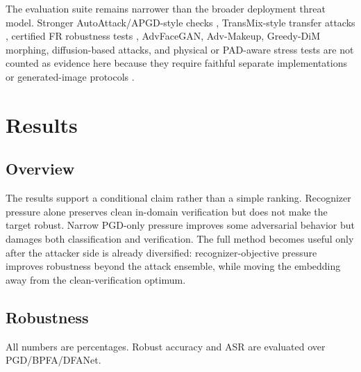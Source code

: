 \documentclass[conference]{IEEEtran}
\begin{document}
The evaluation suite remains narrower than the broader deployment threat
model. Stronger AutoAttack/APGD-style checks \cite{autoattack},
TransMix-style transfer attacks \cite{transmix}, certified FR robustness
tests \cite{certrobustfr}, AdvFaceGAN, Adv-Makeup, Greedy-DiM morphing,
diffusion-based attacks, and physical or PAD-aware stress tests are not counted
as evidence here because they require faithful separate implementations or
generated-image protocols
\cite{advfacegan,advmakeup,greedydim,physicalsurvey,fasattack}.

\section{Results}
\subsection{Overview}
The results support a conditional claim rather than a simple ranking.
Recognizer pressure alone preserves clean in-domain verification but does not
make the target robust. Narrow PGD-only pressure improves some adversarial
behavior but damages both classification and verification. The full method
becomes useful only after the attacker side is already diversified:
recognizer-objective pressure improves robustness beyond the attack ensemble,
while moving the embedding away from the clean-verification optimum.

\subsection{Robustness}

\begin{table}[!t]
\centering
\caption{Closed-set clean and adversarial robustness results. Robust average
is over PGD/BPFA/DFANet unless marked otherwise.}
\label{tab:robust}
\vspace{1mm}
\parbox{\columnwidth}{\centering\footnotesize\setlength{\baselineskip}{8pt}
All numbers are percentages. Robust accuracy and ASR are evaluated over PGD/BPFA/DFANet.}
\end{table}
\end{document}
